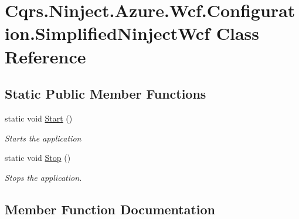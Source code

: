 \hypertarget{classCqrs_1_1Ninject_1_1Azure_1_1Wcf_1_1Configuration_1_1SimplifiedNinjectWcf}{}\section{Cqrs.\+Ninject.\+Azure.\+Wcf.\+Configuration.\+Simplified\+Ninject\+Wcf Class Reference}
\label{classCqrs_1_1Ninject_1_1Azure_1_1Wcf_1_1Configuration_1_1SimplifiedNinjectWcf}
\subsection*{Static Public Member Functions}
\begin{DoxyCompactItemize}
\item 
static void \hyperlink{classCqrs_1_1Ninject_1_1Azure_1_1Wcf_1_1Configuration_1_1SimplifiedNinjectWcf_a4686133f581e5e5d890ec78faa26584e_a4686133f581e5e5d890ec78faa26584e}{Start} ()
\begin{DoxyCompactList}\small\item\em Starts the application \end{DoxyCompactList}\item 
static void \hyperlink{classCqrs_1_1Ninject_1_1Azure_1_1Wcf_1_1Configuration_1_1SimplifiedNinjectWcf_a7a4bdce5525a0b3ae46efacedb74bbda_a7a4bdce5525a0b3ae46efacedb74bbda}{Stop} ()
\begin{DoxyCompactList}\small\item\em Stops the application. \end{DoxyCompactList}\end{DoxyCompactItemize}


\subsection{Member Function Documentation}
\mbox{\label{classCqrs_1_1Ninject_1_1Azure_1_1Wcf_1_1Configuration_1_1SimplifiedNinjectWcf_a4686133f581e5e5d890ec78faa26584e_a4686133f581e5e5d890ec78faa26584e}} 
